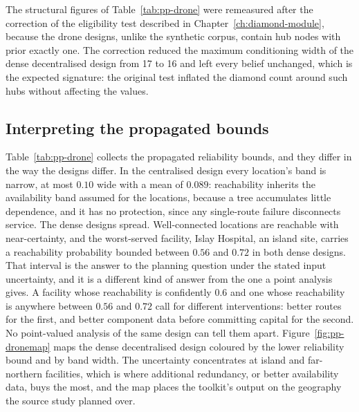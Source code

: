 \documentclass[12pt]{report}
\begin{document}
The structural figures of Table~\ref{tab:pp-drone} were remeasured after the correction of
the eligibility test described in Chapter~\ref{ch:diamond-module}, because the drone
designs, unlike the synthetic corpus, contain hub nodes with prior exactly one. The
correction reduced the maximum conditioning width of the dense decentralised design from 17
to 16 and left every belief unchanged, which is the expected signature: the original test
inflated the diamond count around such hubs without affecting the values.

\subsection{Interpreting the propagated bounds}
\label{sec:pp-case-results}

Table~\ref{tab:pp-drone} collects the propagated reliability bounds, and they differ in the way the designs differ. In the centralised design every location's band is narrow, at most $0.10$ wide with a mean of $0.089$: reachability inherits the availability band assumed for the locations, because a tree accumulates little dependence, and it has no protection, since any single-route failure disconnects service. The dense designs spread. Well-connected locations are reachable with near-certainty, and the worst-served facility, Islay Hospital, an island site, carries a reachability probability bounded between $0.56$ and $0.72$ in both dense designs. That interval is the answer to the planning question under the stated input uncertainty, and it is a different kind of answer from the one a point analysis gives. A facility whose reachability is confidently $0.6$ and one whose reachability is anywhere between $0.56$ and $0.72$ call for different interventions: better routes for the first, and better component data before committing capital for the second. No point-valued analysis of the same design can tell them apart. Figure~\ref{fig:pp-dronemap} maps the dense decentralised design coloured by the lower reliability bound and by band width. The uncertainty concentrates at island and far-northern facilities, which is where additional redundancy, or better availability data, buys the most, and the map places the toolkit's output on the geography the source study planned over.
\end{document}
